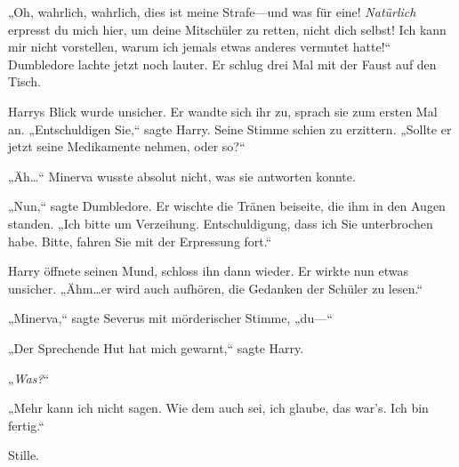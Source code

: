 „Oh, wahrlich, wahrlich, dies ist meine Strafe—und was für eine! \emph{Natürlich} erpresst du mich hier, um deine Mitschüler zu retten, nicht dich selbst! Ich kann mir nicht vorstellen, warum ich jemals etwas anderes vermutet hatte!“ Dumbledore lachte jetzt noch lauter. Er schlug drei Mal mit der Faust auf den Tisch.

Harrys Blick wurde unsicher. Er wandte sich ihr zu, sprach sie zum ersten Mal an. „Entschuldigen Sie,“ sagte Harry. Seine Stimme schien zu erzittern. „Sollte er jetzt seine Medikamente nehmen, oder so?“

„Äh…“ Minerva wusste absolut nicht, was sie antworten konnte.

„Nun,“ sagte Dumbledore. Er wischte die Tränen beiseite, die ihm in den Augen standen. „Ich bitte um Verzeihung. Entschuldigung, dass ich Sie unterbrochen habe. Bitte, fahren Sie mit der Erpressung fort.“

Harry öffnete seinen Mund, schloss ihn dann wieder. Er wirkte nun etwas unsicher. „Ähm…er wird auch aufhören, die Gedanken der Schüler zu lesen.“

„Minerva,“ sagte Severus mit mörderischer Stimme, „du—“

„Der Sprechende Hut hat mich gewarnt,“ sagte Harry.

„\emph{Was?}“

„Mehr kann ich nicht sagen. Wie dem auch sei, ich glaube, das war’s. Ich bin fertig.“

Stille.

